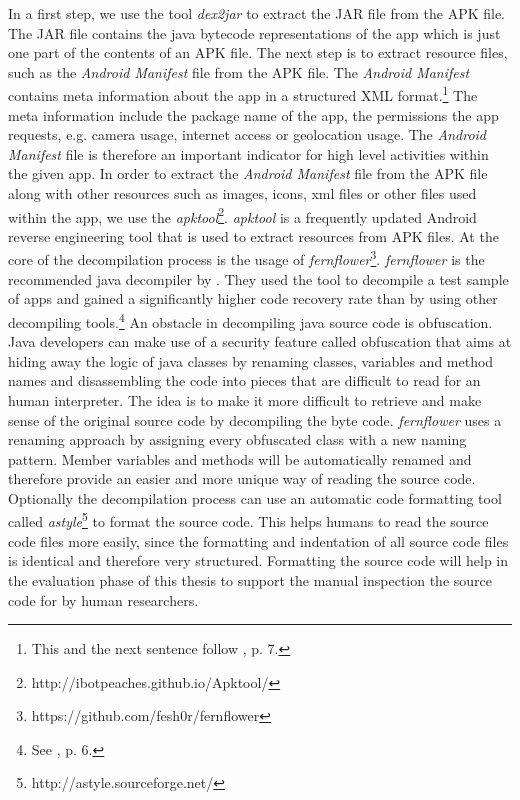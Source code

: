 In a first step, we use the tool \textit{dex2jar} to extract the JAR file from the APK file.
The JAR file contains the java bytecode representations of the app which is just one part of the contents of an APK file.
The next step is to extract resource files, such as the \textit{Android Manifest} file from the APK file.
The \textit{Android Manifest} contains meta information about the app in a structured XML format.\footnote{This and the next sentence follow \cite{xu2013}, p. 7.}
The meta information include the package name of the app, the permissions the app requests, e.g. camera usage, internet access or geolocation usage.
The \textit{Android Manifest} file is therefore an important indicator for high level activities within the given app.
In order to extract the \textit{Android Manifest} file from the APK file along with other resources such as images, icons, xml files or other files used within the app, we use the \textit{apktool}\footnote{http://ibotpeaches.github.io/Apktool/}.
\textit{apktool} is a frequently updated Android reverse engineering tool that is used to extract resources from APK files.
At the core of the decompilation process is the usage of \textit{fernflower}\footnote{https://github.com/fesh0r/fernflower}.
\textit{fernflower} is the recommended java decompiler by \cite{Enck2011}. 
They used the tool to decompile a test sample of apps and gained a significantly higher code recovery rate than by using other decompiling tools.\footnote{See \cite{Enck2011}, p. 6.}
An obstacle in decompiling java source code is obfuscation. 
Java developers can make use of a security feature called obfuscation that aims at hiding away the logic of java classes by renaming classes, variables and method names and disassembling the code into pieces that are difficult to read for an human interpreter.
The idea is to make it more difficult to retrieve and make sense of the original source code by decompiling the byte code.
\textit{fernflower} uses a renaming approach by assigning every obfuscated class with a new naming pattern. 
Member variables and methods will be automatically renamed and therefore provide an easier and more unique way of reading the source code.
Optionally the decompilation process can use an automatic code formatting tool called \textit{astyle}\footnote{http://astyle.sourceforge.net/} to format the source code.
This helps humans to read the source code files more easily, since the formatting and indentation of all source code files is identical and therefore very structured.
Formatting the source code will help in the evaluation phase of this thesis to support the manual inspection the source code for \ipr by human researchers.

